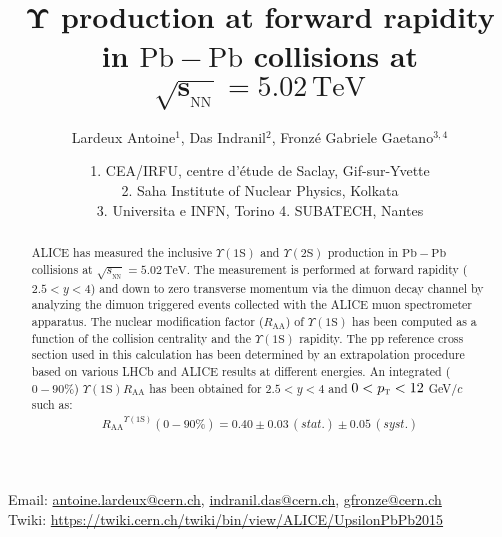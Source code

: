\documentclass[ALICE,manyauthors]{ALICE_analysis_notes}
\newcommand {\sep}        {\xspace}
\newcommand {\pt}        {\ensuremath{p_{\mathrm{\textsc{t}}}}\xspace}
\newcommand {\sqrtSnn}   {\ensuremath{\sqrt{s_{_{\mathrm{NN}}}}}}
\newcommand {\sqrtSnnE}[2][TeV]  {$\sqrtSnn = #2\,\mathrm{#1}$}
\newcommand {\sqrtSnnEb}[2][TeV]  {$\boldsymbol{\sqrtSnn = #2\,\mathrm{#1}}$}
\newcommand {\Raa}       {\ensuremath{R_\mathrm{AA}}}
\newcommand {\ups}      {\ensuremath{\Upsilon\mathrm{(1S)}}\xspace}
\newcommand {\upsp}      {\ensuremath{\Upsilon\mathrm{(2S)}}\xspace}
\newcommand {\PbPb}      {\ensuremath{\mathrm{Pb-Pb}}}
\newcommand {\PbPbb}      {\ensuremath{\boldsymbol{\mathrm{Pb-Pb}}}}
\begin{document}
\begin{titlepage}

\PHdate{\today}

\title{ $\boldsymbol{\Upsilon}$ production at forward rapidity\\ in \PbPbb\sep collisions at \sqrtSnnEb{5.02} }
\ShortTitle{$\Upsilon$ production in \PbPb\space collisions}   %

\author{Lardeux Antoine$^{1}$, Das Indranil$^{2}$, Fronz\'e Gabriele Gaetano$^{3, 4}$}
\author{
1. CEA/IRFU, centre d'\'etude de Saclay, Gif-sur-Yvette\\
2. Saha Institute of Nuclear Physics, Kolkata\\
3. Universita e INFN, Torino
4. SUBATECH, Nantes\\
}

\begin{center} 
Email: \href{mailto:antoine.lardeux@cern.ch}{antoine.lardeux@cern.ch}, \href{mailto:indranil.das@cern.ch}{indranil.das@cern.ch}, \href{mailto:gfronze@cern.ch}{gfronze@cern.ch} \\ 
Twiki: \url{https://twiki.cern.ch/twiki/bin/view/ALICE/UpsilonPbPb2015} 
\end{center} 



\begin{abstract}
ALICE has measured the inclusive \ups\sep and \upsp\sep production in \PbPb\sep collisions at \sqrtSnnE{5.02}. 
The measurement is performed at forward rapidity ($2.5<y<4$) and down to zero transverse momentum via the dimuon decay channel by analyzing the dimuon triggered events collected with the ALICE muon spectrometer apparatus. 
The nuclear modification factor (\Raa) of \ups\sep has been computed as a function of the collision centrality and the \ups\sep rapidity.
The pp reference cross section used in this calculation has been determined by an extrapolation procedure based on various LHCb and ALICE results at different energies.
An integrated ($0-90\%$) \ups\sep \Raa\sep has been obtained for $2.5<y<4$ and $0<\pt<12$ GeV/$c$ such as:
\begin{align*}
\Raa^{\ups} (0-90\%)=0.40 \pm 0.03 \,(stat.) \pm 0.05 \,(syst.)
\end{align*}

\end{abstract}

\end{titlepage}
\end{document}

